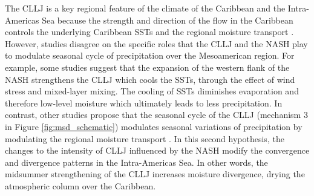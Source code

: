 The CLLJ is a key regional feature of the climate of the Caribbean and the Intra-Americas Sea  because the strength and direction of the flow in the Caribbean controls the underlying Caribbean SSTs and the regional moisture transport \citep{giannini2000,mestas2007,martinez2019,garcia2020sub}. 
 However, studies disagree on the specific roles that the CLLJ and the NASH play to modulate seasonal cycle of precipitation over the Mesoamerican region. 
 For example, some studies \citep[e.g.][]{giannini2000,mestas2007,gamble2008} suggest that  the expansion of the western flank of the NASH strengthens the CLLJ which cools the SSTs, through the effect of wind stress and mixed-layer mixing.
The cooling of SSTs diminishes evaporation and therefore low-level moisture which ultimately leads to less precipitation. In contrast, other studies propose that the seasonal cycle of the CLLJ (mechanism 3 in Figure \ref{fig:msd_schematic}) modulates seasonal variations of precipitation by modulating the regional moisture transport  \citep{small2007,munoz2008,herrera2015,duranquesada2017,martinez2019}. In this second hypothesis, the changes to the intensity of CLLJ influenced by the NASH modify the convergence and divergence patterns in the Intra-Americas Sea. In other words, the midsummer strengthening of the CLLJ increases moisture divergence, drying the atmospheric column over the Caribbean. 


 
    


    

